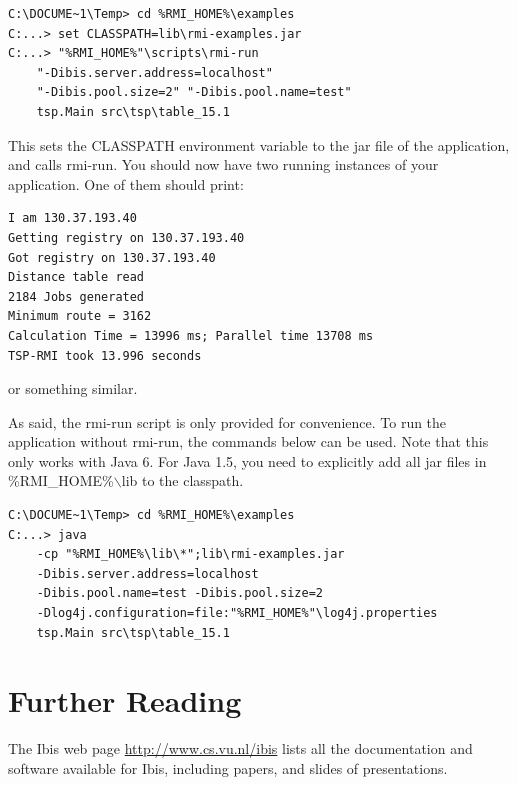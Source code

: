 \documentclass[a4paper,10pt]{article}
\begin{document}
\noindent
{\small
\begin{verbatim}
C:\DOCUME~1\Temp> cd %RMI_HOME%\examples
C:...> set CLASSPATH=lib\rmi-examples.jar
C:...> "%RMI_HOME%"\scripts\rmi-run
    "-Dibis.server.address=localhost"
    "-Dibis.pool.size=2" "-Dibis.pool.name=test"
    tsp.Main src\tsp\table_15.1
\end{verbatim}
}
\noindent

This sets the CLASSPATH environment variable to the jar file of the
application, and calls rmi-run. You should now have two running
instances of your application. One of them should print:

\noindent
{\small
\begin{verbatim}
I am 130.37.193.40
Getting registry on 130.37.193.40
Got registry on 130.37.193.40
Distance table read
2184 Jobs generated
Minimum route = 3162
Calculation Time = 13996 ms; Parallel time 13708 ms
TSP-RMI took 13.996 seconds
\end{verbatim}
}
\noindent

or something similar.

As said, the rmi-run script is only provided for convenience. To run
the application without rmi-run, the commands below can be used.
Note that this only works with Java 6. For Java 1.5, you need to
explicitly add all jar files in \%RMI\_HOME\%$\backslash$lib to the classpath.

\noindent
{\small
\begin{verbatim}
C:\DOCUME~1\Temp> cd %RMI_HOME%\examples
C:...> java
    -cp "%RMI_HOME%\lib\*";lib\rmi-examples.jar
    -Dibis.server.address=localhost
    -Dibis.pool.name=test -Dibis.pool.size=2
    -Dlog4j.configuration=file:"%RMI_HOME%"\log4j.properties
    tsp.Main src\tsp\table_15.1
\end{verbatim}
}
\noindent

\section{Further Reading}

The Ibis web page \url{http://www.cs.vu.nl/ibis} lists all
the documentation and software available for Ibis, including papers, and
slides of presentations.
\end{document}
